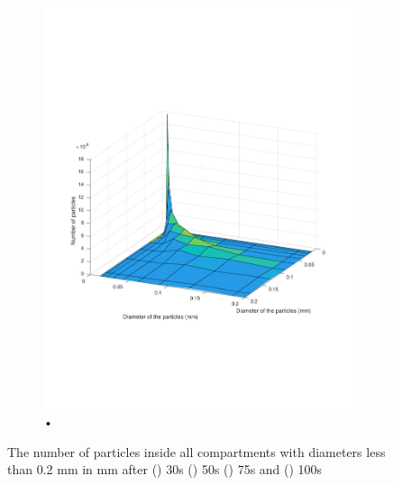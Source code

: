 \documentclass[preprint,11pt,authoryear]{elsarticle}
\begin{document}
\begin{figure}[H]
\begin{subfigure}{.5\textwidth}
\includegraphics[scale=0.45]{rslts:PBM_100s_psd.pdf}
\caption{•}
\label{fig:100s}
\end{subfigure}
\caption{The number of particles inside all compartments with diameters less than 0.2 mm in 
mm after () 30s () 50s () 75s and () 
100s}
\label{fig:rslts_PBM_d50_plots}
\end{figure}   
\end{document}

